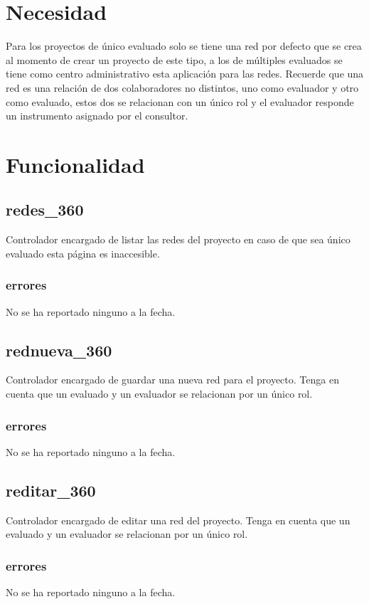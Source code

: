\documentclass[10pt,a4paper]{book}
\begin{document}
	\section{Necesidad}
	
	Para los proyectos de único evaluado solo se tiene una red por defecto que se crea al momento de crear un proyecto de este tipo, a los de múltiples evaluados se tiene como centro administrativo esta aplicación para las redes. Recuerde que una red es una relación de dos colaboradores no distintos, uno como evaluador y otro como evaluado, estos dos se relacionan con un único rol y el evaluador responde un instrumento asignado por el consultor.
	
	\section{Funcionalidad}

	\subsection{redes\_360}
	Controlador encargado de listar las redes del proyecto en caso de que sea único evaluado esta página es inaccesible. 
	\subsubsection{errores}
	No se ha reportado ninguno a la fecha.
	
	\subsection{rednueva\_360}
	Controlador encargado de guardar una nueva red para el proyecto. Tenga en cuenta que un evaluado y un evaluador se relacionan por un único rol.
	\subsubsection{errores}
	No se ha reportado ninguno a la fecha.
	
	\subsection{reditar\_360}
	Controlador encargado de editar una red del proyecto. Tenga en cuenta que un evaluado y un evaluador se relacionan por un único rol.
	\subsubsection{errores}
	No se ha reportado ninguno a la fecha.
	
\end{document}
